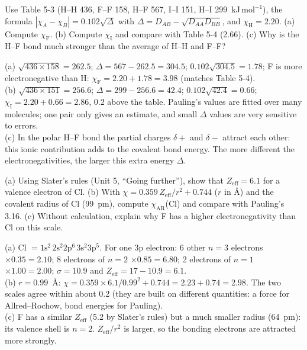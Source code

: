 Use Table 5-3 (H--H 436, F--F 158, H--F 567, I--I 151, H--I 299~$\mathrm{kJ\,mol^{-1}}$), the formula
$|\chi_A - \chi_B| = 0.102\sqrt{\Delta}$ with $\Delta = D_{AB} - \sqrt{D_{AA}D_{BB}}$, and $\chi_\mathrm H = 2.20$.
(a) Compute $\chi_\mathrm F$. (b) Compute $\chi_\mathrm I$ and compare with Table 5-4 (2.66). (c) Why is
the H--F bond much stronger than the average of H--H and F--F?
\begin{solution}
(a) $\sqrt{436\times158} = 262.5$; $\Delta = 567 - 262.5 = 304.5$; $0.102\sqrt{304.5} = 1.78$;
F is more electronegative than H: $\chi_\mathrm F = 2.20 + 1.78 = 3.98$ (matches Table 5-4).\\
(b) $\sqrt{436\times151} = 256.6$; $\Delta = 299 - 256.6 = 42.4$; $0.102\sqrt{42.4} = 0.66$;
$\chi_\mathrm I = 2.20 + 0.66 = 2.86$, 0.2 above the table. Pauling's values are fitted over many
molecules; one pair only gives an estimate, and small $\Delta$ values are very sensitive to errors.\\
(c) In the polar H--F bond the partial charges $\delta+$ and $\delta-$ attract each other: this ionic
contribution adds to the covalent bond energy. The more different the electronegativities, the larger
this extra energy $\Delta$.
\end{solution}

(a) Using Slater's rules (Unit 5, ``Going further''), show that $Z_\mathrm{eff} = 6.1$ for a valence
electron of Cl. (b) With $\chi = 0.359\,Z_\mathrm{eff}/r^2 + 0.744$ ($r$ in \AA) and the covalent radius
of Cl (99~pm), compute $\chi_\mathrm{AR}$(Cl) and compare with Pauling's 3.16. (c) Without calculation,
explain why F has a higher electronegativity than Cl on this scale.
\begin{solution}
(a) Cl $= 1\mathrm s^2\,2\mathrm s^2 2\mathrm p^6\,3\mathrm s^2 3\mathrm p^5$. For one 3p electron:
6 other $n = 3$ electrons $\times0.35 = 2.10$; 8 electrons of $n = 2$ $\times0.85 = 6.80$; 2 electrons of
$n = 1$ $\times1.00 = 2.00$; $\sigma = 10.9$ and $Z_\mathrm{eff} = 17 - 10.9 = 6.1$.\\
(b) $r = 0.99$~\AA: $\chi = 0.359\times6.1/0.99^2 + 0.744 = 2.23 + 0.74 = 2.98$. The two scales agree
within about 0.2 (they are built on different quantities: a force for Allred--Rochow, bond energies
for Pauling).\\
(c) F has a similar $Z_\mathrm{eff}$ (5.2 by Slater's rules) but a much smaller radius (64~pm): its
valence shell is $n = 2$. $Z_\mathrm{eff}/r^2$ is larger, so the bonding electrons are attracted
more strongly.
\end{solution}

